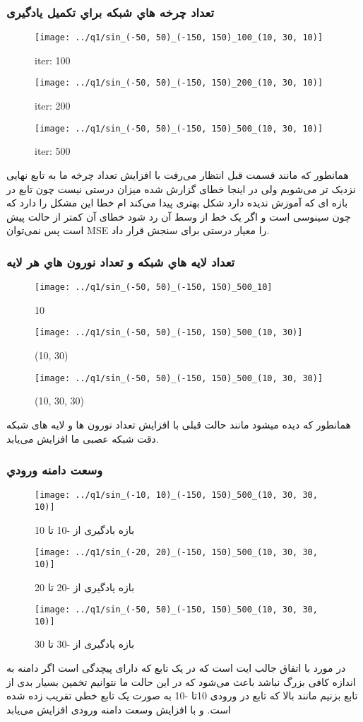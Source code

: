 \documentclass[a4paper,12pt]{article}
\begin{document}
\subsubsection{تعداد چرخه هاي شبکه براي تکمیل یادگیری}

\begin{figure}[!htb]
  \texttt{[image: ../q1/sin\_(-50, 50)\_(-150, 150)\_100\_(10, 30, 10)]}
  \caption{iter: 100}
\endminipage\hfill
{}
  \texttt{[image: ../q1/sin\_(-50, 50)\_(-150, 150)\_200\_(10, 30, 10)]}
  \caption{iter: 200}
\endminipage\hfill
{}
  \texttt{[image: ../q1/sin\_(-50, 50)\_(-150, 150)\_500\_(10, 30, 10)]}
  \caption{iter: 500}
\endminipage
\end{figure}
همانطور که مانند قسمت قبل انتظار می‌رفت با افزایش تعداد چرخه ما به تابع نهایی نزدیک تر می‌شویم ولی در اینجا خطای گزارش شده میزان درستی نیست چون تابع در بازه ای که آموزش ندیده دارد شکل بهتری پیدا می‌کند ام خطا این مشکل را دارد که چون سینوسی است و اگر یک خط از وسط آن رد شود خطای آن کمتر از حالت پیش است پس نمی‌توان MSE را معیار درستی برای سنجش قرار داد.


 \subsubsection{تعداد لایه هاي شبکه و تعداد نورون هاي هر لایه}
\begin{figure}[!htb]
  \texttt{[image: ../q1/sin\_(-50, 50)\_(-150, 150)\_500\_10]}
  \caption{10}
\endminipage\hfill
{}
  \texttt{[image: ../q1/sin\_(-50, 50)\_(-150, 150)\_500\_(10, 30)]}
  \caption{(10, 30)}
\endminipage\hfill
{}
  \texttt{[image: ../q1/sin\_(-50, 50)\_(-150, 150)\_500\_(10, 30, 30)]}
  \caption{(10, 30, 30)}
\endminipage\hfill
\end{figure}
همانطور که دیده میشود مانند حالت قبلی با افزایش تعداد نورون ها و لایه های شبکه دقت شبکه عصبی ما افزایش می‌یابد.



\newpage
\subsubsection{وسعت دامنه ورودي }
\begin{figure}[!htb]
  \texttt{[image: ../q1/sin\_(-10, 10)\_(-150, 150)\_500\_(10, 30, 30, 10)]}
  \caption{بازه بادگیری از -10 تا 10}
\endminipage\hfill
{}
  \texttt{[image: ../q1/sin\_(-20, 20)\_(-150, 150)\_500\_(10, 30, 30, 10)]}
  \caption{بازه یادگیری از -20 تا 20}
\endminipage\hfill
{}
  \texttt{[image: ../q1/sin\_(-50, 50)\_(-150, 150)\_500\_(10, 30, 30, 10)]}
  \caption{بازه یادگیری از -30 تا 30}
\endminipage
\end{figure}
در مورد با اتفاق جالب ایت است که در یک تابع که دارای پیچدگی است اگر دامنه به اندازه کافی بزرگ نباشد باعث می‌شود که در این حالت ما نتوانیم تخمین بسیار بدی از تابع بزنیم مانند بالا که تابع در ورودی 10تا -10 به صورت یک تابع خطی تقریب زده شده است. و با افزایش وسعت دامنه ورودی افزایش می‌یابد
\end{document}
